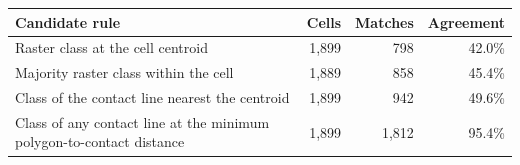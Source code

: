 \begin{tabular}{p{}rrr}
\toprule
Candidate rule & Cells & Matches & Agreement \\
\midrule
Raster class at the cell centroid & 1,899 & 798 & 42.0\% \\
Majority raster class within the cell & 1,889 & 858 & 45.4\% \\
Class of the contact line nearest the centroid & 1,899 & 942 & 49.6\% \\
Class of any contact line at the minimum polygon-to-contact distance & 1,899 & 1,812 & 95.4\% \\
\bottomrule
\end{tabular}
